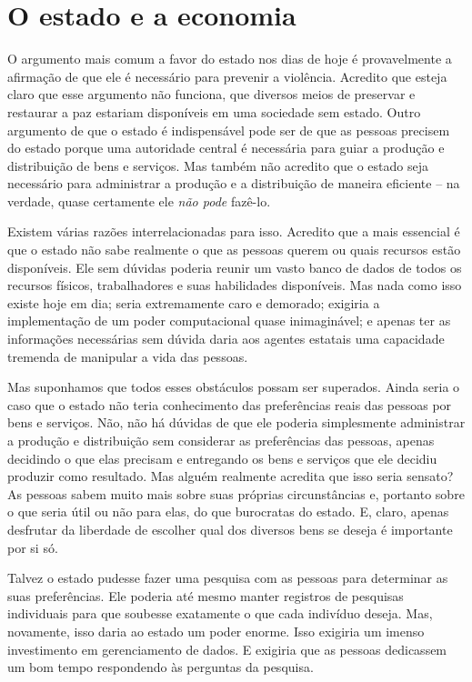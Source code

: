 \section{O estado e a economia}

O argumento mais comum a favor do estado nos dias de hoje é provavelmente a afirmação de que ele é necessário para prevenir a violência. Acredito que esteja claro que esse argumento não funciona, que diversos meios de preservar e restaurar a paz estariam disponíveis em uma sociedade sem estado. Outro argumento de que o estado é indispensável pode ser de que as pessoas precisem do estado porque uma autoridade central é necessária para guiar a produção e distribuição de bens e serviços. Mas também não acredito que o estado seja necessário para administrar a produção e a distribuição de maneira eficiente -- na verdade, quase certamente ele \emph{não pode} fazê-lo.

Existem várias razões interrelacionadas para isso. Acredito que a mais essencial é que o estado não sabe realmente o que as pessoas querem ou quais recursos estão disponíveis. Ele sem dúvidas poderia reunir um vasto banco de dados de todos os recursos físicos, trabalhadores e suas habilidades disponíveis. Mas nada como isso existe hoje em dia; seria extremamente caro e demorado; exigiria a implementação de um poder computacional quase inimaginável; e apenas ter as informações necessárias sem dúvida daria aos agentes estatais uma capacidade tremenda de manipular a vida das pessoas.

Mas suponhamos que todos esses obstáculos possam ser superados. Ainda seria o caso que o estado não teria conhecimento das preferências reais das pessoas por bens e serviços. Não, não há dúvidas de que ele poderia simplesmente administrar a produção e distribuição sem considerar as preferências das pessoas, apenas decidindo o que elas precisam e entregando os bens e serviços que ele decidiu produzir como resultado. Mas alguém realmente acredita que isso seria sensato? As pessoas sabem muito mais sobre suas próprias circunstâncias e, portanto sobre o que seria útil ou não para elas, do que burocratas do estado. E, claro, apenas desfrutar da liberdade de escolher qual dos diversos bens se deseja é importante por si só.

Talvez o estado pudesse fazer uma pesquisa com as pessoas para determinar as suas preferências. Ele poderia até mesmo manter registros de pesquisas individuais para que soubesse exatamente o que cada indivíduo deseja. Mas, novamente, isso daria ao estado um poder enorme. Isso exigiria um imenso investimento em gerenciamento de dados. E exigiria que as pessoas dedicassem um bom tempo respondendo às perguntas da pesquisa.

